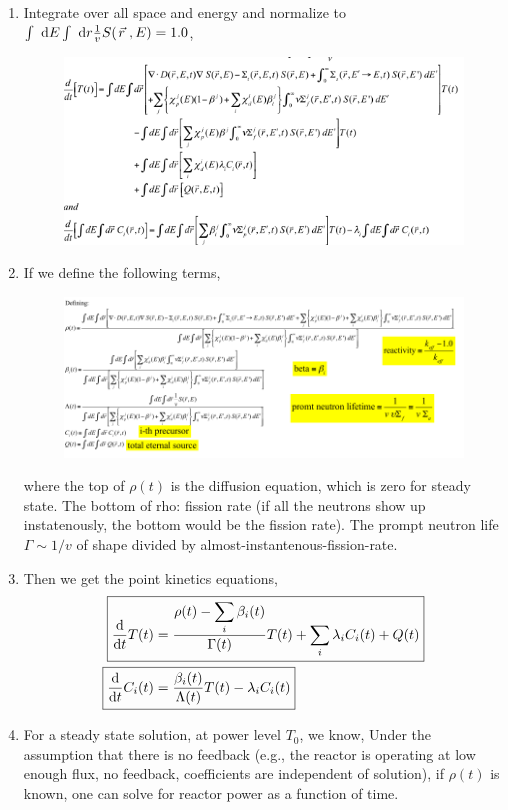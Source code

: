 \documentclass{school-22.211-notes}
\begin{document}
\begin{enumerate}
\clearpage
\item Integrate over all space and energy and normalize to $\int \mbox{ }\mathrm{d} E \int \mbox{ }\mathrm{d} r \frac{1}{v} S(\left.\vec{r}\right., E) = 1.0$, 
\begin{figure}[ht]
  \centering
  \includegraphics[width=4.5in]{images/pke/pke2.png}
\end{figure}

\item If we define the following terms, 
\begin{figure}[ht]
  \centering
  \includegraphics[width=6in]{images/pke/pke3.png}
\end{figure}
where the top of $\rho(t)$ is the diffusion equation, which is zero for steady state.  The bottom of rho: fission rate (if all the neutrons show up instatenously, the bottom would be the fission rate). The prompt neutron life $\Gamma \sim 1/v$ of shape divided by almost-instantenous-fission-rate. 

\item Then we get the point kinetics equations,
\begin{align}
\Aboxed{ \ddt T(t) &= \frac{\rho(t) - \Sum_i \beta_i (t) }{\Gamma (t)} T(t) + \Sum_i \lambda_i C_i (t) + Q(t) } \\
\Aboxed{ \ddt C_i (t) &= \frac{\beta_i (t)}{\Lambda (t)} T(t) - \lambda_i C_i (t) } 
\end{align}

\item For a steady state solution, at power level $T_0$, we know, 
Under the assumption that there is no feedback (e.g., the reactor is operating at low enough flux, no feedback, coefficients are independent of solution), if $\rho(t)$ is known, one can solve for reactor power as a function of time.


\end{enumerate}
\end{document}
